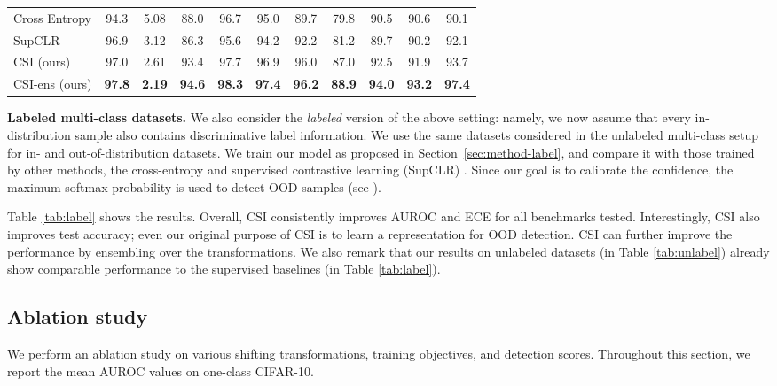 \documentclass{article}
\begin{document}
\begin{table}[t]
\begin{subtable}{\textwidth}
{\begin{tabular}{lcccccccccc}
\midrule
Cross Entropy & 94.3 & 5.08 & 88.0 & 96.7 & 95.0 & 89.7 & 79.8 & 90.5 & 90.6 & 90.1 \\
SupCLR \citep{khosla2020supervised} & 96.9 & 3.12 & 86.3 & 95.6 & 94.2 & 92.2 & 81.2 & 89.7 & 90.2 & 92.1 \\
CSI (ours) & 97.0 & 2.61 & 93.4 & 97.7 & 96.9 & 96.0 & 87.0 & 92.5 & 91.9 & 93.7 \\
CSI-ens (ours) & \textbf{97.8} & \textbf{2.19} & \textbf{94.6} & \textbf{98.3} & \textbf{97.4} & \textbf{96.2} & \textbf{88.9} & \textbf{94.0} & \textbf{93.2} & \textbf{97.4} \\
\bottomrule
\end{tabular}}
\end{subtable}
\vspace{-0.1in}
\end{table}

 
\textbf{Labeled multi-class datasets.}
We also consider the \emph{labeled} version of the above setting: namely, we now assume that every in-distribution sample also contains discriminative label information. We use the same datasets considered in the unlabeled multi-class setup for in- and out-of-distribution datasets. We train our model as proposed in Section~\ref{sec:method-label}, and compare it with those trained by other methods, the cross-entropy and supervised contrastive learning (SupCLR) \citep{khosla2020supervised}. Since our goal is to calibrate the confidence, the maximum softmax probability is used to detect OOD samples (see \citep{hendrycks2017baseline}).

Table \ref{tab:label} shows the results. Overall, CSI consistently improves AUROC and ECE for all benchmarks tested. Interestingly, CSI also improves test accuracy; even our original purpose of CSI is to learn a representation for OOD detection. CSI can further improve the performance by ensembling over the transformations. We also remark that our results on unlabeled datasets (in Table \ref{tab:unlabel}) already show comparable performance to the supervised baselines (in Table \ref{tab:label}).

\vspace{-0.05in}
\subsection{Ablation study}
\vspace{-0.05in}
\label{sec:exp-ablation}

We perform an ablation study on various shifting transformations, training objectives, and detection scores. Throughout this section, we report the mean AUROC values on one-class CIFAR-10.
\end{document}
